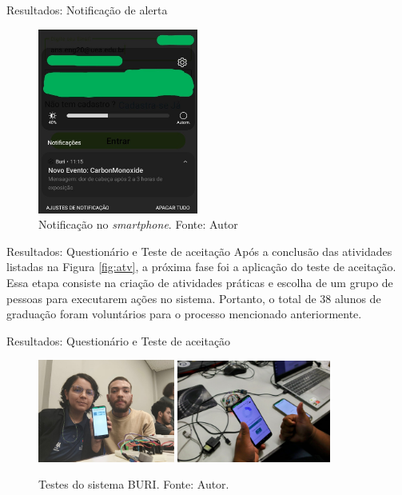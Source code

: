 \documentclass[12pt]{beamer}
\begin{document}
    \begin{frame}{Resultados: Notificação de alerta}
        \begin{figure}[ht]
            \centering
            \includegraphics[width=0.47\textwidth]{img/notificação.jpg}
            \caption{Notificação no \textit{smartphone}. Fonte: Autor}\label{fig:notification}
        \end{figure}
    \end{frame}

    \begin{frame}{Resultados: Questionário e Teste de aceitação}
        Após a conclusão das atividades listadas na Figura \ref{fig:atv}, a próxima fase foi 
        a aplicação do teste de aceitação. Essa etapa consiste na criação de atividades práticas e escolha de um 
        grupo de pessoas para executarem ações no sistema. Portanto, o total de 38 alunos de graduação foram voluntários 
        para o processo mencionado anteriormente.
    \end{frame}

    \begin{frame}{Resultados: Questionário e Teste de aceitação}
        \begin{figure}[ht]
            \centering
            \includegraphics[width=0.40\textwidth]{img/teste/app1.jpeg}
            \includegraphics[width=0.45\textwidth]{img/teste/hard2.jpeg}
            \caption{Testes do sistema BURI. Fonte: Autor.}\label{fig:testes-fotos}
        \end{figure}
    \end{frame}
\end{document}

